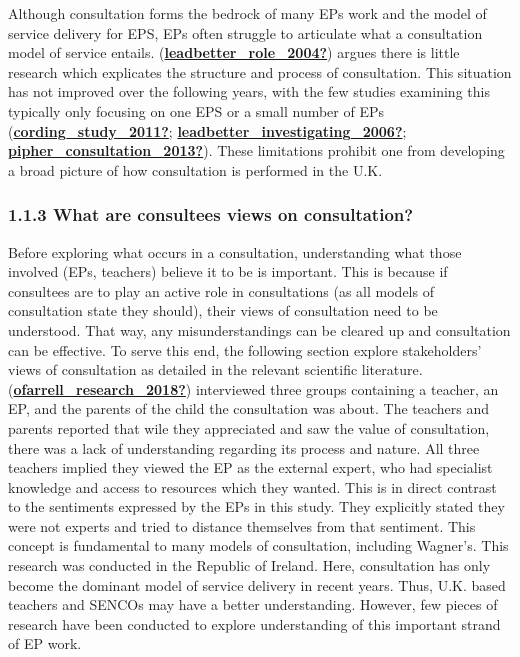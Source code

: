 \documentclass[
]{article}
\begin{document}
Although consultation forms the bedrock of many EPs work and the model
of service delivery for EPS, EPs often struggle to articulate what a
consultation model of service entails.
(\protect\hyperlink{ref-leadbetter_role_2004}{\textbf{leadbetter\_role\_2004?}})
argues there is little research which explicates the structure and
process of consultation. This situation has not improved over the
following years, with the few studies examining this typically only
focusing on one EPS or a small number of EPs
(\protect\hyperlink{ref-cording_study_2011}{\textbf{cording\_study\_2011?}};
\protect\hyperlink{ref-leadbetter_investigating_2006}{\textbf{leadbetter\_investigating\_2006?}};
\protect\hyperlink{ref-pipher_consultation_2013}{\textbf{pipher\_consultation\_2013?}}).
These limitations prohibit one from developing a broad picture of how
consultation is performed in the U.K.

\hypertarget{what-are-consultees-views-on-consultation}{%
\subsubsection{1.1.3 What are consultees views on
consultation?}\label{what-are-consultees-views-on-consultation}}

Before exploring what occurs in a consultation, understanding what those
involved (EPs, teachers) believe it to be is important. This is because
if consultees are to play an active role in consultations (as all models
of consultation state they should), their views of consultation need to
be understood. That way, any misunderstandings can be cleared up and
consultation can be effective. To serve this end, the following section
explore stakeholders' views of consultation as detailed in the relevant
scientific literature.
(\protect\hyperlink{ref-ofarrell_research_2018}{\textbf{ofarrell\_research\_2018?}})
interviewed three groups containing a teacher, an EP, and the parents of
the child the consultation was about. The teachers and parents reported
that wile they appreciated and saw the value of consultation, there was
a lack of understanding regarding its process and nature. All three
teachers implied they viewed the EP as the external expert, who had
specialist knowledge and access to resources which they wanted. This is
in direct contrast to the sentiments expressed by the EPs in this study.
They explicitly stated they were not experts and tried to distance
themselves from that sentiment. This concept is fundamental to many
models of consultation, including Wagner's. This research was conducted
in the Republic of Ireland. Here, consultation has only become the
dominant model of service delivery in recent years. Thus, U.K. based
teachers and SENCOs may have a better understanding. However, few pieces
of research have been conducted to explore understanding of this
important strand of EP work.
\end{document}

